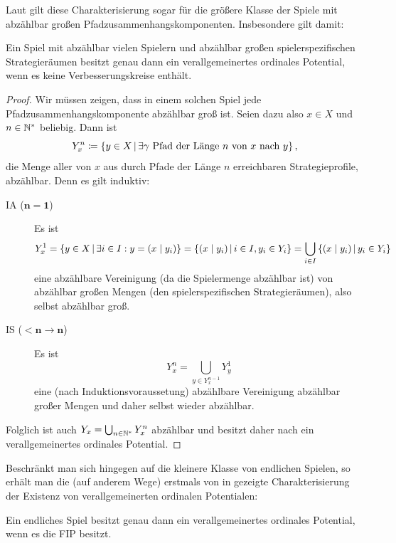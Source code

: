 Laut  gilt diese Charakterisierung sogar für die größere Klasse der Spiele mit abzählbar großen Pfadzusammenhangskomponenten. Insbesondere gilt damit:

\begin{kor}
	Ein Spiel mit abzählbar vielen Spielern und abzählbar großen spielerspezifischen Strategieräumen besitzt genau dann ein verallgemeinertes ordinales Potential, wenn es keine Verbesserungskreise enthält.
\end{kor}

\begin{proof}
	Wir müssen zeigen, dass in einem solchen Spiel jede Pfadzusammenhangskomponente abzählbar groß ist. Seien dazu also $x \in X$ und $n \in \mathbb{N}^\ast$ beliebig. Dann ist
		\[Y_x^n \coloneqq \left\{y \in X \,\middle|\, \exists \gamma \text{ Pfad der Länge $n$ von $x$ nach $y$}\right\}, \]
	die Menge aller von $x$ aus durch Pfade der Länge $n$ erreichbaren Strategieprofile, abzählbar. Denn es gilt induktiv:
	\begin{description}
		\item[IA ($\bm{n=1}$)] Es ist
			\[Y_x^1 = \left\{y \in X \,\middle|\, \exists i \in I: y = (x \mid y_i)\right\} = \left\{(x \mid y_i) \,\middle|\, i \in I, y_i \in Y_i \right\} = \bigcup_{i \in I} \left\{(x \mid y_i) \,\middle|\, y_i \in Y_i \right\}\]
			eine abzählbare Vereinigung (da die Spielermenge abzählbar ist) von abzählbar großen Mengen (den spielerspezifischen Strategieräumen), also selbst abzählbar groß.
		\item[IS ($\bm{<n \to n}$)] Es ist
			\[Y_x^n = \bigcup_{y \in Y_x^{n-1}} Y_y^1\]
			eine (nach Induktionsvoraussetung) abzählbare Vereinigung abzählbar großer Mengen und daher selbst wieder abzählbar.
	\end{description}
	Folglich ist auch $Y_x = \bigcup_{n\in\mathbb{N}^\ast} Y_x^n$ abzählbar und besitzt daher nach  ein verallgemeinertes ordinales Potential.
\end{proof}

Beschränkt man sich hingegen auf die kleinere Klasse von endlichen Spielen, so erhält man die (auf anderem Wege) erstmals von \citeauthor{MonShap} in \cite[Lemma 2.5]{MonShap} gezeigte Charakterisierung der Existenz von verallgemeinerten ordinalen Potentialen:

\begin{kor}
	Ein endliches Spiel besitzt genau dann ein verallgemeinertes ordinales Potential, wenn es die FIP besitzt.
\end{kor}

